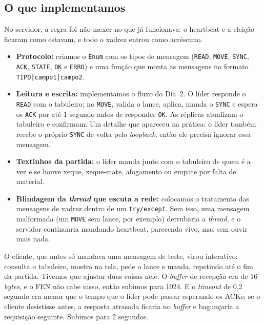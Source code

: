 \subsection*{O que implementamos}
No servidor, a regra foi não mexer no que já funcionava: o heartbeat e a eleição ficaram como estavam, e todo o xadrez entrou como acréscimo.
\begin{itemize}
    \item \textbf{Protocolo:} criamos o \texttt{Enum} com os tipos de mensagem (\texttt{READ}, \texttt{MOVE}, \texttt{SYNC}, \texttt{ACK}, \texttt{STATE}, \texttt{OK} e \texttt{ERRO}) e uma função que monta as mensagens no formato \texttt{TIPO|campo1|campo2}.

    \item \textbf{Leitura e escrita:} implementamos o fluxo do Dia~2. O líder responde o \texttt{READ} com o tabuleiro; no \texttt{MOVE}, valida o lance, aplica, manda o \texttt{SYNC} e espera os \texttt{ACK} por até 1 segundo antes de responder \texttt{OK}. As réplicas atualizam o tabuleiro e confirmam. Um detalhe que apareceu na prática: o líder também recebe o próprio \texttt{SYNC} de volta pelo \textit{loopback}, então ele precisa ignorar essa mensagem.

    \item \textbf{Textinhos da partida:} o líder manda junto com o tabuleiro de quem é a vez e se houve xeque, xeque-mate, afogamento ou empate por falta de material.

    \item \textbf{Blindagem da \textit{thread} que escuta a rede:} colocamos o tratamento das mensagens de xadrez dentro de um \texttt{try/except}. Sem isso, uma mensagem malformada (um \texttt{MOVE} sem lance, por exemplo) derrubaria a \textit{thread}, e o servidor continuaria mandando heartbeat, parecendo vivo, mas sem ouvir mais nada.
\end{itemize}

O cliente, que antes só mandava uma mensagem de teste, virou interativo: consulta o tabuleiro, mostra na tela, pede o lance e manda, repetindo até o fim da partida. Tivemos que ajustar duas coisas nele. O \textit{buffer} de recepção era de 16 \textit{bytes}, e o FEN não cabe nisso, então subimos para 1024. E o \textit{timeout} de 0,2 segundo era menor que o tempo que o líder pode passar esperando os ACKs; se o cliente desistisse antes, a resposta atrasada ficaria no \textit{buffer} e bagunçaria a requisição seguinte. Subimos para 2 segundos.

